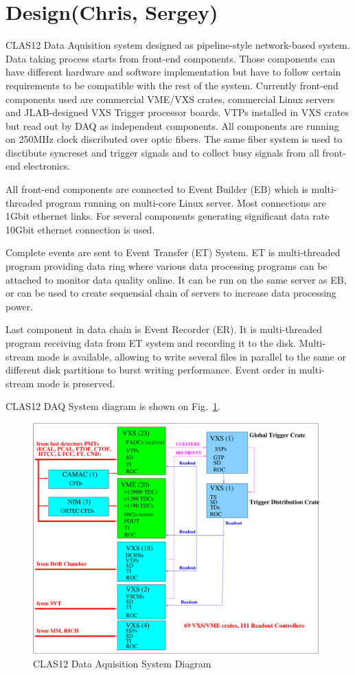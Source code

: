 \section{Design(Chris, Sergey)}

CLAS12 Data Aquisition system designed as pipeline-style network-based system. Data taking process starts from front-end components. Those components can have different hardware and software implementation but have to follow certain requirements to be compatible with the rest of the system. Currently front-end components used are commercial VME/VXS crates, commercial Linux servers and JLAB-designed VXS Trigger processor boards. VTPs installed in VXS crates but read out by DAQ as independent components. All components are running on 250MHz clock discributed over optic fibers. The same fiber system is used to disctibute syncreset and trigger signals and to collect busy signals from all front-end electronics.

All front-end components are connected to Event Builder (EB) which is multi-threaded program running on multi-core Linux server. Most connections are 1Gbit ethernet links. For several components generating significant data rate 10Gbit ethernet connection is used.

Complete events are sent to Event Transfer (ET) System. ET is multi-threaded program providing data ring where various data processing programs can be attached to monitor data quality online. It can be run on the same server as EB, or can be used to create sequensial chain of servers to increase data processing power.

Last component in data chain is Event Recorder (ER). It is multi-threaded program receiving data from ET system and recording it to the disk. Multi-stream mode is available, allowing to write several files in parallel to the same or different disk partitions to burst writing performance. Event order in multi-stream mode is preserved.

CLAS12 DAQ System diagram is shown on Fig.~\ref{fig:DAQdiagram}.

\begin{figure}[hbt]
	\centering
	\includegraphics[width=1.0\columnwidth,keepaspectratio]{img/CLAS12_HARDWARE_2.pdf}
	\caption{CLAS12 Data Aquisition System Diagram}
	\label{fig:DAQdiagram}
\end{figure}

